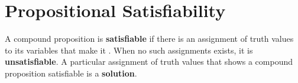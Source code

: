 %

\section{Propositional Satisfiability}

A compound proposition is \textbf{satisfiable} if there is an assignment of truth values to its variables that make it \ltrue{}.
When no such assignments exists, it is \textbf{unsatisfiable}.
A particular assignment of truth values that shows a compound proposition satisfiable is a \textbf{solution}.

